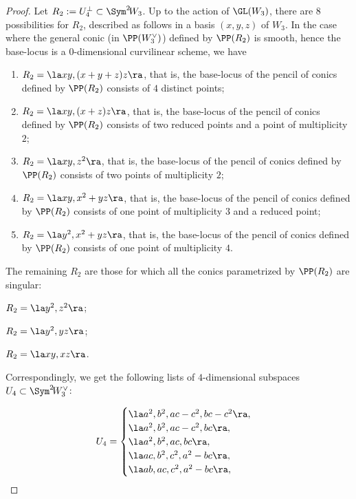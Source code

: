 \begin{proof}
Let $R_2:=U_4^{\bot}\subset \Sym^2 \!W_3$. Up to the action of $\GL(W_3)$, there are $8$ possibilities for $R_2$, described as follows in a basis $(x,y,z)$ of $W_3$. In the case where the general conic (in $\PP(W^{\vee}_3)$) defined by $\PP(R_2)$ is smooth, hence the base-locus is a $0$-dimensional curvilinear scheme, we have
\begin{enumerate}
\item
$R_2=\la xy,(x+y+z)z\ra$, that is, the base-locus of the pencil of conics defined by $\PP(R_2)$ consists of $4$ distinct points;
\item
$R_2=\la xy,(x+z)z\ra$, that is, the base-locus of the pencil of conics defined by $\PP(R_2)$ consists of two reduced points and a point of multiplicity $2$;
\item
$R_2=\la xy,z^2\ra$, that is, the base-locus of the pencil of conics defined by $\PP(R_2)$ consists of two points of multiplicity $2$;
\item
$R_2=\la xy,x^2+yz\ra$, that is, the base-locus of the pencil of conics defined by $\PP(R_2)$ consists of one point of multiplicity $3$ and a reduced point;
\item
$R_2=\la y^2,x^2+yz\ra$, that is, the base-locus of the pencil of conics defined by $\PP(R_2)$ consists of one point of multiplicity $4$.
\end{enumerate}
The remaining $R_2$ are those for which all the conics parametrized by $\PP(R_2)$ are singular:
\begin{enumeratea}
\item
$R_2=\la y^2,z^2\ra$;
\item
$R_2=\la y^2,y z\ra$;
\item
$R_2=\la xy,xz\ra$.
\end{enumeratea}
\noindent
Correspondingly, we get the following lists of $4$-dimensional subspaces $U_4\subset \Sym^2 \!W^{\vee}_3$:
\par\noindent
\begin{minipage}[m]{.5\textwidth}
\begin{equation}\label{primocaso}
U_4=
\begin{cases}
\la a^2,b^2,ac-c^2,bc-c^2\ra, \\
\la a^2,b^2,ac-c^2,bc\ra, \\
\la a^2,b^2,ac,bc\ra, \\
\la ac,b^2,c^2,a^2-bc\ra, \\
\la ab,ac,c^2,a^2-bc\ra,
\end{cases}
\end{equation}

\end{minipage}
\end{proof}
